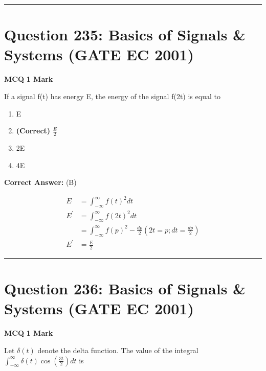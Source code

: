 \documentclass[11pt,a4paper]{article}
\begin{document}
\vspace{1.5em}
\hrule
\vspace{1.5em}

\section*{Question 235: Basics of Signals \& Systems (GATE EC 2001)}
\noindent \textbf{\color{primary}MCQ} \hfill \textbf{\color{secondary}1 Mark}


\noindent If a signal f(t) has energy E, the energy of the signal f(2t) is equal to


\begin{enumerate}[label=(\Alph*)]
    \item E
    \item \textbf{(Correct)} $\frac{E}{2}$
    \item 2E
    \item 4E
\end{enumerate}

\noindent \textbf{Correct Answer:} (B)

\begin{tcolorbox}[solbox, title=Detailed Solution -- Question 235]
\[
\begin{aligned} E &=\int_{-\infty}^{\infty} f(t)^{2} d t \\ E^{\prime} &=\int_{-\infty}^{\infty} f(2 t)^{2} d t \\ &=\int_{-\infty}^{\infty} f(p)^{2}-\frac{d p}{2}\left(2 t=p ; d t=\frac{d p}{2}\right) \\ E^{\prime} &=\frac{E}{2} \end{aligned}
\]
\end{tcolorbox}

\vspace{1.5em}
\hrule
\vspace{1.5em}

\section*{Question 236: Basics of Signals \& Systems (GATE EC 2001)}
\noindent \textbf{\color{primary}MCQ} \hfill \textbf{\color{secondary}1 Mark}


\noindent Let $\delta(t)$ denote the delta function. The value of the integral $\int_{-\infty }^{\infty}\delta (t)\cos \left ( \frac{3t}{2} \right )dt$ is
\end{document}

